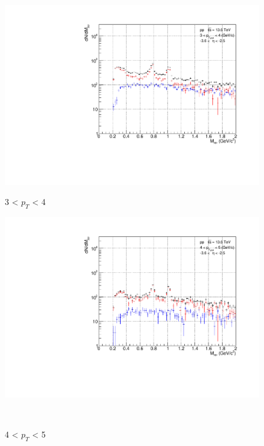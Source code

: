 \begin{figure}[H]
                    \vspace{1em}
                    \begin{minipage}{0.45\textwidth}
                        \centering
                        \includegraphics[width=\textwidth]{fig/3_4_1_CB_pt_3to4.pdf}
                        \caption*{3 < $p_{T}$ < 4}
                    \end{minipage}
                    \hfill
                    \begin{minipage}{0.45\textwidth}
                        \centering
                        \includegraphics[width=\textwidth]{fig/3_4_1_CB_pt_4to5.pdf}
                        \caption*{4 < $p_{T}$ < 5}
                    \end{minipage}
                    \\

\end{figure}

